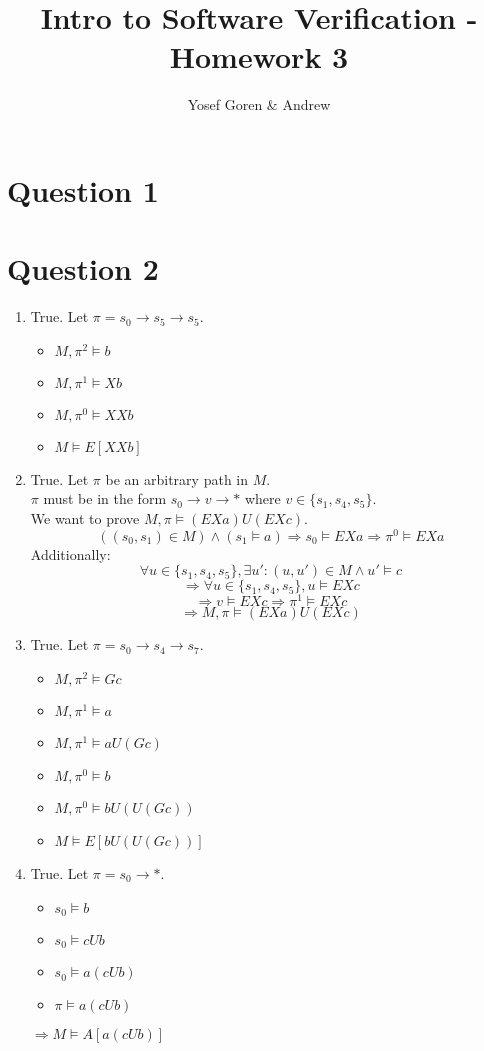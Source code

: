 \documentclass{article}
\begin{document}
\author{Yosef Goren \& Andrew }
\title{Intro to Software Verification - Homework 3}
\maketitle
\section*{Question 1}
\section*{Question 2}
\begin{enumerate}
    \item True. Let $\pi=s_0\rightarrow s_5\rightarrow s_5$.
        \begin{itemize}
            \item $M,\pi^2\models b$
            \item $M,\pi^1\models Xb$
            \item $M,\pi^0\models XXb$
            \item $M\models E[XXb]$
        \end{itemize}
    \item True. Let $\pi$ be an arbitrary path in $M$.\\
        $\pi$ must be in the form $s_0\rightarrow v\rightarrow *$
        where $v\in\{s_1,s_4,s_5\}$.\\
        We want to prove $M,\pi\models (EXa)U(EXc)$.\\
        \[\left((s_0,s_1)\in M\right)\wedge\left(s_1\models a\right)\Rightarrow s_0\models EXa\Rightarrow \pi^0\models EXa\]
        Additionally:
        \[\forall u\in\{s_1,s_4,s_5\}, \exists u':(u,u')\in M\wedge u'\models c\]
        \[\Rightarrow \forall u\in\{s_1,s_4,s_5\}, u\models EXc\]
        \[\Rightarrow v\models EXc\Rightarrow \pi^1\models EXc\]
        \[\Rightarrow M,\pi\models (EXa)U(EXc)\]
    \item True. Let $\pi=s_0\rightarrow s_4\rightarrow s_7$.
        \begin{itemize}
            \item $M,\pi^2\models Gc$
            \item $M,\pi^1\models a$
            \item $M,\pi^1\models aU(Gc)$
            \item $M,\pi^0\models b$
            \item $M,\pi^0\models bU(U(Gc))$
            \item $M\models E[bU(U(Gc))]$
        \end{itemize}
    \item True. Let $\pi=s_0\rightarrow *$.\\
        \begin{itemize}
            \item $s_0\models b$
            \item $s_0\models cUb$
            \item $s_0\models a(cUb)$
            \item $\pi\models a(cUb)$
        \end{itemize}
        $\Rightarrow M\models A[a(cUb)]$
\end{enumerate}
\end{document}
